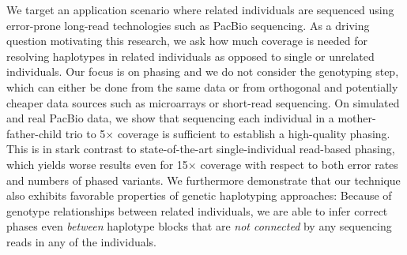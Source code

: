 We target an application scenario where related individuals are sequenced using error-prone long-read technologies such as PacBio sequencing.
As a driving question motivating this research, we ask how much coverage is needed for resolving haplotypes in related individuals as opposed to single or unrelated individuals.
Our focus is on phasing and we do not consider the genotyping step, which can either be done from the same data or from orthogonal and potentially cheaper data sources such as microarrays or short-read sequencing.
On simulated and real PacBio data, we show that sequencing each individual in a mother-father-child trio to 5$\times$ coverage is sufficient to establish a high-quality phasing.
This is in stark contrast to state-of-the-art single-individual read-based phasing, which yields worse results even for 15$\times$ coverage with respect to both error rates and numbers of phased variants.
We furthermore demonstrate that our technique also exhibits favorable properties of genetic haplotyping approaches:
Because of genotype relationships between related individuals, we are able to infer correct phases even \emph{between} haplotype blocks that are \emph{not connected} by any sequencing reads in any of the individuals.

